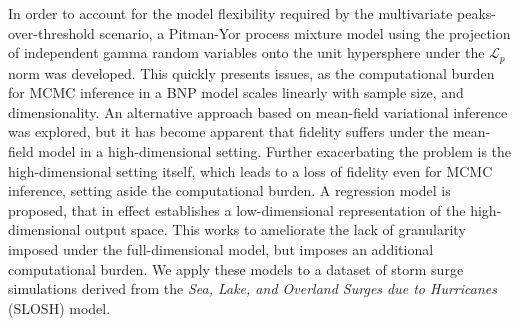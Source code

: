 In order to account for the model flexibility required by the multivariate
    peaks-over-threshold scenario, a Pitman-Yor process mixture model using
    the projection of independent gamma random variables onto the unit 
    hypersphere under the $\mathcal{L}_p$ norm was developed.  This quickly
    presents issues, as the computational burden for MCMC inference in a BNP
    model scales linearly with sample size, and dimensionality.
    An alternative approach based on mean-field variational inference was explored,
    but it has become apparent that fidelity suffers under the mean-field model
    in a high-dimensional setting.  Further exacerbating the problem is the
    high-dimensional setting itself, which leads to a loss of fidelity even for
    MCMC inference, setting aside the computational burden.  A regression model
    is proposed, that in effect establishes a low-dimensional representation of the 
    high-dimensional output space.  This works to ameliorate the lack of granularity
    imposed under the full-dimensional model, but imposes an additional computational
    burden.  We apply these models to a dataset of storm surge simulations 
    derived from the \emph{Sea, Lake, and Overland Surges due to Hurricanes} 
    (SLOSH) model.
    
